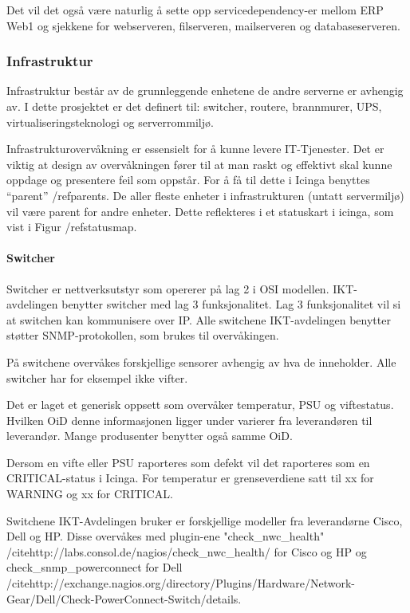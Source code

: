 Det vil det også være naturlig å sette opp servicedependency-er mellom ERP Web1 og sjekkene for webserveren, filserveren, mailserveren og databaseserveren.

\subsubsection{Infrastruktur}
Infrastruktur består av de grunnleggende enhetene de andre serverne er avhengig av. I dette prosjektet er det definert til: switcher, routere, brannmurer, UPS, virtualiseringsteknologi og serverrommiljø.

Infrastrukturovervåkning er essensielt for å kunne levere IT-Tjenester. Det er viktig at design av overvåkningen fører til at man raskt og effektivt skal kunne oppdage og presentere feil som oppstår. For å få til dette i Icinga benyttes “parent” /ref{parents}. De aller fleste enheter i infrastrukturen (untatt servermiljø) vil være parent for andre enheter. Dette reflekteres i et statuskart i icinga, som vist i Figur /ref{statusmap}.

\paragraph{Switcher}
Switcher er nettverksutstyr som opererer på lag 2 i OSI modellen. IKT-avdelingen benytter switcher med lag 3 funksjonalitet. Lag 3 funksjonalitet vil si at switchen kan kommunisere over IP. Alle switchene IKT-avdelingen benytter støtter SNMP-protokollen, som brukes til overvåkingen.

På switchene overvåkes forskjellige sensorer avhengig av hva de inneholder. Alle switcher har for eksempel ikke vifter.

Det er laget et generisk oppsett som overvåker temperatur, PSU og viftestatus. Hvilken OiD denne informasjonen ligger under varierer fra leverandøren til leverandør. Mange produsenter benytter også samme OiD. 

Dersom en vifte eller PSU raporteres som defekt vil det raporteres som en CRITICAL-status i Icinga. For temperatur er grenseverdiene satt til xx for WARNING og xx for CRITICAL.

Switchene IKT-Avdelingen bruker er forskjellige modeller fra leverandørne Cisco, Dell og HP. Disse overvåkes med plugin-ene "check\_nwc\_health" /cite{http://labs.consol.de/nagios/check\_nwc\_health/} for Cisco og HP og check\_snmp\_powerconnect for Dell /cite{http://exchange.nagios.org/directory/Plugins/Hardware/Network-Gear/Dell/Check-PowerConnect-Switch/details}.

